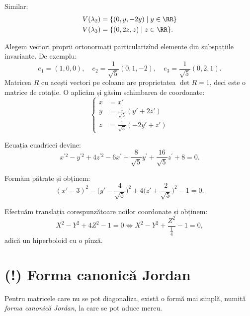 Similar:
\begin{align*}
  V(\lambda_2) &= \{ (0, y, -2y) \mid y \in \RR \} \\
  V(\lambda_3) &= \{ (0, 2z, z) \mid z \in \RR \}.
\end{align*}

Alegem vectori proprii ortonormați particularizînd elemente din subspațiile invariante.
De exemplu:
\[
  e_1 = (1, 0, 0), \quad e_2 = \frac{1}{\sqrt{5}} (0, 1, -2), \quad e_3 = \frac{1}{\sqrt{5}}(0, 2, 1).
\]
Matricea $R$ cu acești vectori pe coloane are proprietatea $\det R = 1$, deci este o matrice
de rotație. O aplicăm și găsim schimbarea de coordonate:
\[
  \begin{cases}
    x &= x' \\
    y &= \frac{1}{\sqrt{5}} (y' + 2z') \\
    z &= \frac{1}{\sqrt{5}} (-2y' + z')
  \end{cases}
\]

Ecuația cuadricei devine:
\[
  x^{\prime 2} - y^{\prime 2} + 4 z^{\prime 2} - 6x^\prime + %
  \frac{8}{\sqrt{5}} y^\prime + \frac{16}{\sqrt{5}} z^\prime + 8 = 0.
\]

Formăm pătrate și obținem:
\[
  (x' - 3)^2 - \big( y' - \frac{4}{\sqrt{5}} \big)^2 + 4 \big(z' + \frac{2}{\sqrt{5}} \big)^2 - 1 = 0.
\]

Efectuăm translația corespunzătoare noilor coordonate și obținem:
\[
  X^2 - Y^2 + 4Z^2 - 1 = 0 \Leftrightarrow X^2 - Y^2 + \frac{Z^2}{\frac{1}{4}} - 1 = 0,
\]
adică un hiperboloid cu o pînză.


\section{(!) Forma canonică Jordan}
\label{sec:jordan}

Pentru matricele care nu se pot diagonaliza, există o formă mai simplă, numită
\emph{forma canonică Jordan}, la care se pot aduce mereu.

